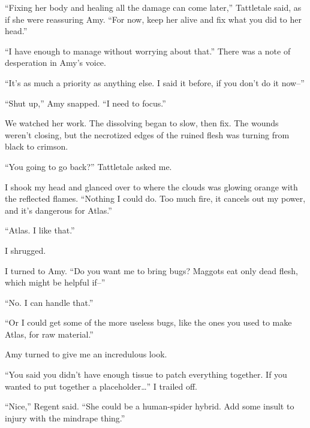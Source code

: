 ``Fixing her body and healing all the damage can come later,'' Tattletale said, as if she were reassuring Amy.  ``For now, keep her alive and fix what you did to her head.''



``I have enough to manage without worrying about that.''  There was a note of desperation in Amy's voice.



``It's as much a priority as anything else.  I said it before, if you don't do it now--''



``Shut up,'' Amy snapped.  ``I need to focus.''



We watched her work.  The dissolving began to slow, then fix.  The wounds weren't closing, but the necrotized edges of the ruined flesh was turning from black to crimson.



``You going to go back?''  Tattletale asked me.



I shook my head and glanced over to where the clouds was glowing orange with the reflected flames.  ``Nothing I could do.  Too much fire, it cancels out my power, and it's dangerous for Atlas.''



``Atlas.  I like that.''



I shrugged.



I turned to Amy.  ``Do you want me to bring bugs?  Maggots eat only dead flesh, which might be helpful if--''



``No.  I can handle that.''



``Or I could get some of the more useless bugs, like the ones you used to make Atlas, for raw material.''



Amy turned to give me an incredulous look.



``You said you didn't have enough tissue to patch everything together.  If you wanted to put together a placeholder\ldots''  I trailed off.



``Nice,'' Regent said.  ``She could be a human-spider hybrid.  Add some insult to injury with the mindrape thing.''



